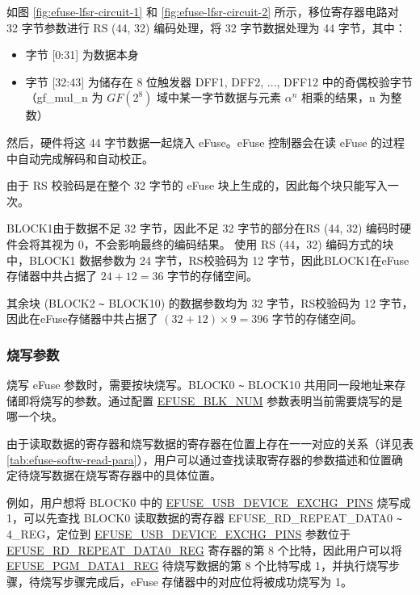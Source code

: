 \documentclass[main\_\_CN.tex]{subfiles}
\begin{document}
如图 \ref{fig:efuse-lfsr-circuit-1} 和 \ref{fig:efuse-lfsr-circuit-2} 所示，移位寄存器电路对 32 字节参数进行 RS (44, 32) 编码处理，将 32 字节数据处理为 44 字节，其中：

\begin{itemize}
    \item 字节 [0:31] 为数据本身
    \item 字节 [32:43] 为储存在 8 位触发器 DFF1, DFF2, ..., DFF12 中的奇偶校验字节（gf\_mul\_n 为 \(GF(2^8)\) 域中某一字节数据与元素 \(\alpha^n\) 相乘的结果，n 为整数）
\end{itemize}

然后，硬件将这 44 字节数据一起烧入 eFuse。eFuse 控制器会在读 eFuse 的过程中自动完成解码和自动校正。

由于 RS 校验码是在整个 32 字节的 eFuse 块上生成的，因此每个块只能写入一次。

BLOCK1由于数据不足 32 字节，因此不足 32 字节的部分在RS (44, 32) 编码时硬件会将其视为 0，不会影响最终的编码结果。
使用 RS (44，32) 编码方式的块中，BLOCK1 数据参数为 24 字节，RS校验码为 12 字节，因此BLOCK1在eFuse存储器中共占据了 $24 + 12 = 36$ 字节的存储空间。

其余块 (BLOCK2 \verb+~+ BLOCK10) 的数据参数均为 32 字节，RS校验码为 12 字节，因此在eFuse存储器中共占据了 $(32 + 12) \times 9 = 396$ 字节的存储空间。

\subsubsection{烧写参数}
\label{sec:efuse-software-programming-para}


烧写 eFuse 参数时，需要按块烧写。BLOCK0 \verb+~+ BLOCK10 共用同一段地址来存储即将烧写的参数。通过配置 \hyperref[fielddesc:EFUSEBLKNUM]{EFUSE\_BLK\_NUM} 参数表明当前需要烧写的是哪一个块。

由于读取数据的寄存器和烧写数据的寄存器在位置上存在一一对应的关系（详见表 \ref{tab:efuse-softw-read-para}），用户可以通过查找读取寄存器的参数描述和位置确定待烧写数据在烧写寄存器中的具体位置。

例如，用户想将 BLOCK0 中的 \hyperref[fielddesc:EFUSEUSBDEVICEEXCHGPINS]{EFUSE\_USB\_DEVICE\_EXCHG\_PINS} 烧写成 1，可以先查找 BLOCK0 读取数据的寄存器 EFUSE\_RD\_REPEAT\_DATA0 \verb+~+ 4\_REG，定位到 \hyperref[fielddesc:EFUSEUSBDEVICEEXCHGPINS]{EFUSE\_USB\_DEVICE\_EXCHG\_PINS} 参数位于 \hyperref[regdesc:EFUSERDREPEATDATA0REG]{EFUSE\_RD\_REPEAT\_DATA0\_REG} 寄存器的第 8 个比特，因此用户可以将 \hyperref[regdesc:EFUSEPGMDATANREG]{EFUSE\_PGM\_DATA1\_REG} 待烧写数据的第 8 个比特写成 1，并执行烧写步骤，待烧写步骤完成后，eFuse 存储器中的对应位将被成功烧写为 1。
\end{document}
